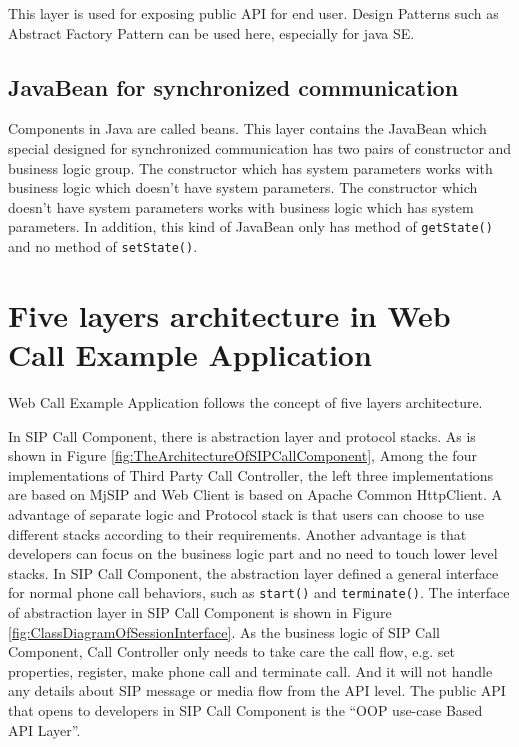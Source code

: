 This layer is used for exposing public API for end user. Design Patterns such as Abstract Factory Pattern can be used here, especially for java SE.

\subsection{JavaBean for synchronized communication}

Components in Java are called beans. This layer contains the JavaBean which special designed for synchronized communication has two pairs of constructor and business logic group. The constructor which has system parameters works with business logic which doesn't have system parameters. The constructor which doesn't have system parameters works with business logic which has system parameters. In addition, this kind of JavaBean only has method of \texttt{getState()} and no method of \texttt{setState()}. 

\section{Five layers architecture in Web Call Example Application}

Web Call Example Application follows the concept of five layers architecture. 

In SIP Call Component, there is abstraction layer and protocol stacks. As is shown in Figure \ref{fig:TheArchitectureOfSIPCallComponent}, Among the four implementations of Third Party Call Controller, the left three implementations are based on \textsf{MjSIP} and Web Client is based on \textsf{Apache} \textsf{Common} \textsf{HttpClient}. A advantage of separate logic and Protocol stack is that users can choose to use different stacks according to their requirements. Another advantage is that developers can focus on the business logic part and no need to touch lower level stacks. In SIP Call Component, the abstraction layer defined a general interface for normal phone call behaviors, such as \texttt{start()} and \texttt{terminate()}. The interface of abstraction layer in SIP Call Component is shown in Figure \ref{fig:ClassDiagramOfSessionInterface}.  As the business logic of SIP Call Component, Call Controller only needs to take care the call flow, e.g. set properties, register, make phone call and terminate call. And it will not handle any details about SIP message or media flow from the API level. The public API that opens to developers in SIP Call Component is the ``OOP use-case Based API Layer''. 

